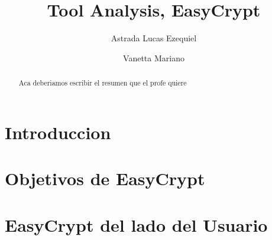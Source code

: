 \documentclass[runningheads,a4paper]{llncs}
\begin{document}
\mainmatter  %

\title{Tool Analysis, EasyCrypt}


%
%
\author{Astrada Lucas Ezequiel
\and Vanetta Mariano}
%


%
%

\maketitle


\begin{abstract}
Aca deberiamos escribir el resumen que el profe quiere
\end{abstract}

\section{Introduccion}

\section{Objetivos de EasyCrypt}

\section{EasyCrypt del lado del Usuario}
\end{document}
